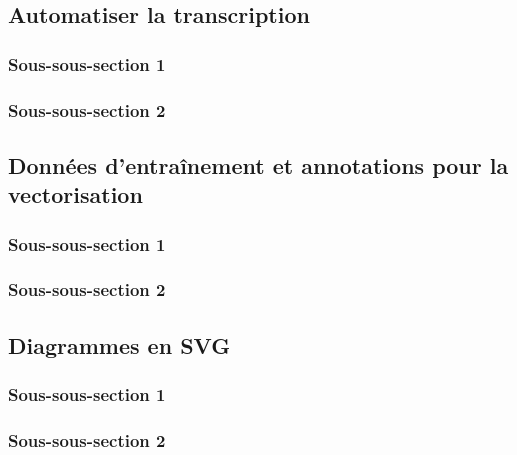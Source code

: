 
\subsection{Automatiser la transcription}
    \subsubsection{Sous-sous-section 1}

    
    \subsubsection{Sous-sous-section 2}

    
    \subsection{Données d’entraînement et annotations pour la vectorisation}
        \subsubsection{Sous-sous-section 1}


        \subsubsection{Sous-sous-section 2}


    \subsection{Diagrammes en SVG}
        \subsubsection{Sous-sous-section 1}


        \subsubsection{Sous-sous-section 2}


